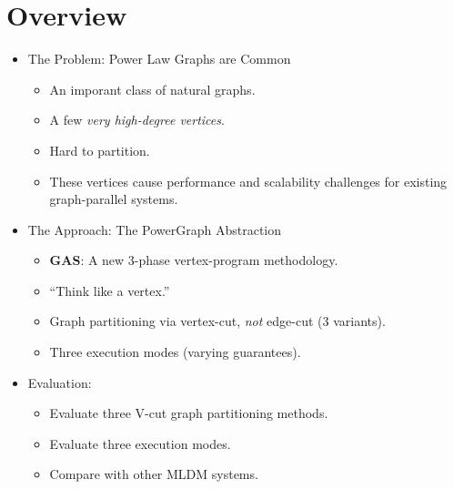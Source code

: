 \section*{Overview}

\begin{frame}
\begin{itemize}
  \frametitle{Overview}
  \item The Problem: Power Law Graphs are Common
  \begin{itemize}
    \item An imporant class of natural graphs.
    \item A few \textit{very high-degree vertices}.
    \item Hard to partition.
    \item These vertices cause performance and scalability challenges for
          existing graph-parallel systems.
  \end{itemize}
\end{itemize}
\end{frame}

\begin{frame}
\begin{itemize}
  \frametitle{Overview}
  \item The Approach: The PowerGraph Abstraction
  \begin{itemize}
    \item \textbf{GAS}: A new 3-phase vertex-program methodology.
    \item ``Think like a vertex.'' \citep[SIGMOD '10]{malewicz2010pregel}
    \item Graph partitioning via vertex-cut, \textit{not} edge-cut (3 variants).
    \item Three execution modes (varying guarantees).
  \end{itemize}

  \item Evaluation:
  \begin{itemize}
    \item Evaluate three V-cut graph partitioning methods.
    \item Evaluate three execution modes.
    \item Compare with other MLDM systems.
  \end{itemize}
\end{itemize}
\end{frame}

